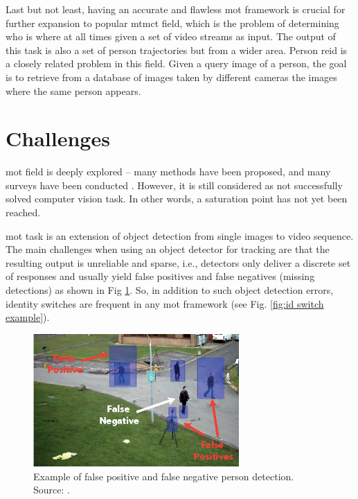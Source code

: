 \begin{introduction}
        Last but not least, having an accurate and flawless \gls{mot} framework is crucial for further expansion to popular \gls{mtmct} field, which is the problem of determining who is where at all times given a set of video streams as input. The output of this task is also a set of person trajectories but from a wider area. Person \gls{reid} is a closely related problem in this field. Given a query image of a person, the goal is to retrieve from a database of images taken by different cameras the images where the same person appears. \cite{ristani2016MTMC}
        
    \section{Challenges}
        \gls{mot} field is deeply explored -- many methods have been proposed, and many surveys have been conducted \cite{luo2014multiple, fan2016survey, emami2018machine}. However, it is still considered as not successfully solved computer vision task. In other words, a saturation point has not yet been reached.
        
        \gls{mot} task is an extension of object detection from single images to video sequence. 
        The main challenges when using an object detector for tracking are that the resulting output is unreliable and sparse, i.e., detectors only deliver a discrete set of responses and usually yield false positives and false negatives (missing detections) as shown in Fig \ref{fig:false positive and false negative}. So, in addition to such object detection errors, identity switches are frequent in any \gls{mot} framework (see Fig. \ref{fig:id switch example}). 
    
        \begin{figure}[ht]
          \centering
          \includegraphics[width=0.7\textwidth]{resources/false-positive_and_false_negative.png}
          \caption{Example of false positive and false negative person detection. Source: \cite{yao2012interactive}.}
          \label{fig:false positive and false negative}
        \end{figure}
        

\end{introduction}
